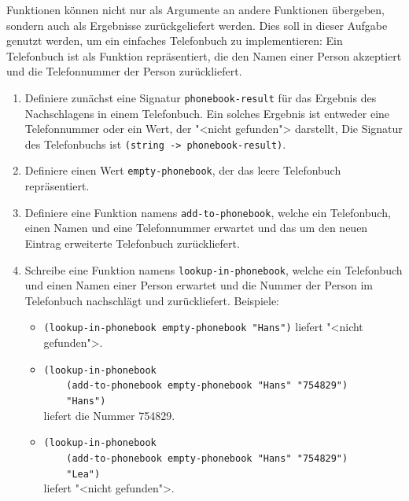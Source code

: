 \begin{aufgabe}
  Funktionen können nicht nur als Argumente an
  andere Funktionen übergeben, sondern auch als Ergebnisse
  zurückgeliefert werden. Dies soll in dieser Aufgabe genutzt werden,
  um ein einfaches Telefonbuch zu implementieren: Ein Telefonbuch ist
  als Funktion repräsentiert, die den Namen einer Person akzeptiert
  und die Telefonnummer der Person zurückliefert.

  \begin{enumerate}
  \item Definiere zunächst eine Signatur
    \lstinline{phonebook-result} für das Ergebnis des Nachschlagens in einem
    Telefonbuch. Ein solches Ergebnis ist entweder eine Telefonnummer
    oder ein Wert, der "<nicht gefunden"> darstellt,
    Die Signatur des Telefonbuchs ist  \lstinline{(string -> phonebook-result)}.
  \item Definiere einen Wert \lstinline{empty-phonebook}, der das leere
    Telefonbuch repräsentiert.
  \item Definiere eine Funktion namens
    \lstinline{add-to-phonebook}, welche ein Telefonbuch, einen Namen
    und eine Telefonnummer erwartet und das um den neuen Eintrag
    erweiterte
    Telefonbuch zurückliefert.
  \item Schreibe eine Funktion namens \lstinline{lookup-in-phonebook},
    welche ein Telefonbuch und einen Namen einer Person erwartet und die
    Nummer der Person im Telefonbuch nachschlägt und zurückliefert.
    Beispiele:
    \begin{itemize}
    \item \lstinline{(lookup-in-phonebook empty-phonebook "Hans")} liefert
      "<nicht gefunden">.
    \item \lstinline{(lookup-in-phonebook} \\
      \lstinline{    (add-to-phonebook empty-phonebook "Hans" "754829")}\\
      \lstinline{    "Hans")} \\
      liefert die Nummer 754829.
    \item \lstinline{(lookup-in-phonebook}\\
      \lstinline{    (add-to-phonebook empty-phonebook "Hans" "754829")}\\
      \lstinline{    "Lea")}\\
      liefert "<nicht gefunden">.
    \end{itemize}
  \end{enumerate}
\end{aufgabe}


